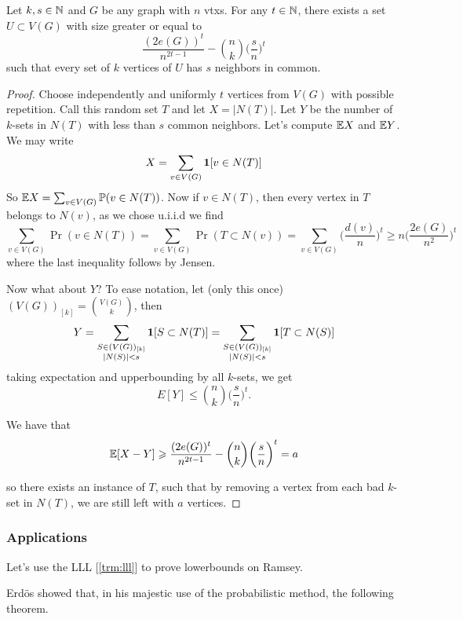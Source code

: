 \begin{theorem} 
	\label{trm:drc}
	Let $k, s\in \mathbb{N}$ and $G$ be any graph with $n$ vtxs. For any $t \in
	\mathbb{N}$, there exists a set $U \subset V(G)$ with size greater or equal to
	\[
		\frac{(2e(G))^t}{n^{2t - 1}} - \binom{n}{k}\bigg(\frac{s}{n}\bigg)^t
	\]
	such that every set of $k$ vertices of $U$ has $s$ neighbors in common.
\end{theorem}
\begin{proof}
	Choose independently and uniformly $t$ vertices from $V(G)$ with
	possible repetition. Call this random set $T$ and
	let $X = |N(T)|$. Let $Y$ be the number of $k$-sets in $N(T)$ with
	less than $s$ common neighbors. Let's compute $\mathbb{E} X$ and $\mathbb{E} Y$. We may write
	\[
		X = \sum_{v \in V(G)} \bm{1}[v \in N(T)]
	\]
	So $\mathbb{E} X = \sum_{v \in V(G)} \mathbb{P}(v \in N(T))$. Now if $v \in N(T)$,
	then every vertex in $T$ belongs to $N(v)$, as we chose u.i.i.d we find
	\[
		\sum_{v \in V(G)} \Pr(v \in N(T)) = \sum_{v \in V(G)} \Pr(T \subset
		N(v)) = \sum_{v \in V(G)} \bigg(\frac{d(v)}{n}\bigg)^t \geq n
		\bigg(\frac{2e(G)}{n^2}\bigg)^t
	\]
	where the last inequality follows by Jensen.

	Now what about $Y$? To ease notation, let (only this once)
	$(V(G))_{[k]} = \binom{V(G)}{k}$, then
	\[
		Y = \sum_{\substack{S \in (V(G))_{[k]}\\|N(S)| < s}} \bm{1}[S \subset
		N(T)] = \sum_{\substack{S \in (V(G))_{[k]}\\|N(S)| < s}} \bm{1}[T \subset N(S)]
	\]
	taking expectation and upperbounding by all $k$-sets, we get
	\[
		E[Y] \leq \binom{n}{k} \bigg(\frac{s}{n}\bigg)^t.
	\]

	We have that
	\begin{equation}
		\label{eq:drc_expec}
		\mathbb{E} [X - Y] \geqslant \frac{(2e(G))^t}{n^{2t - 1}} -
		\binom{n}{k}\bigg(\frac{s}{n}\bigg)^t = a
	\end{equation}

	so there exists an instance of $T$, such that by removing a vertex
	from each bad $k$-set in $N(T)$, we are still
	left with $a$ vertices.
\end{proof}

\subsubsection{Applications}
Let's use the LLL [\ref{trm:lll}] to prove lowerbounds on Ramsey.

Erdös showed that, in his majestic use of the probabilistic method,
the following theorem.

